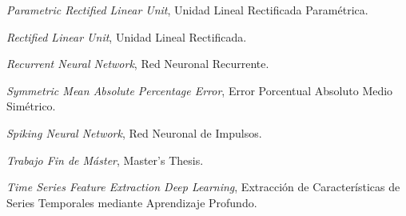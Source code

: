 \begin{description}[labelwidth=3cm,leftmargin=3.5cm,style=nextline]
\item[\textbf{PReLU}] \textit{Parametric Rectified Linear Unit}, Unidad Lineal Rectificada Paramétrica.

\item[\textbf{ReLU}] \textit{Rectified Linear Unit}, Unidad Lineal Rectificada.

\item[\textbf{RNN}] \textit{Recurrent Neural Network}, Red Neuronal Recurrente.

\item[\textbf{SMAPE}] \textit{Symmetric Mean Absolute Percentage Error}, Error Porcentual Absoluto Medio Simétrico.

\item[\textbf{SNN}] \textit{Spiking Neural Network}, Red Neuronal de Impulsos.

\item[\textbf{TFM}] \textit{Trabajo Fin de Máster}, Master's Thesis.

\item[\textbf{TSFEDL}] \textit{Time Series Feature Extraction Deep Learning}, Extracción de Características de Series Temporales mediante Aprendizaje Profundo.

\end{description}
